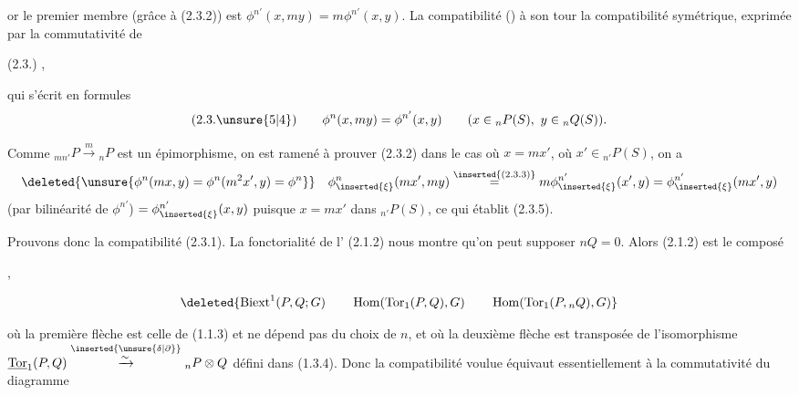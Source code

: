 
or le premier membre (grâce à (2.3.2)) est $\phi^{n'}(x,my)=m\phi^{n'}(x,y)$. La compatibilité  ()  à son tour  la compatibilité symétrique, exprimée par la commutativité de

(2.3.)
,

qui s'écrit en formules
\[
(2.3.\unsure{5|4})\qquad \phi^n(x,my)=\phi^{n'}(x,y)\qquad (x\in{}_nP(S),\ y\in{}_nQ(S)).
\]

Comme ${}_{mn'}P\xrightarrow{m}{}_nP$ est un épimorphisme, on est ramené à prouver (2.3.2) dans le cas où $x=mx'$, où $x'\in{}_{n'}P(S)$,  on a
\[
\deleted{\unsure{\phi^n(mx,y)=\phi^n(m^2x',y)=\phi^n}}
\quad
\phi^n_{\inserted{\xi}}(mx',my)\overset{\inserted{(2.3.3)}}{=}m\phi^{n'}_{\inserted{\xi}}(x',y)=\phi^{n'}_{\inserted{\xi}}(mx',y)
\]
(par bilinéarité de $\phi^{n'}$) $=\phi^{n'}_{\inserted{\xi}}(x,y)$ puisque $x=mx'$ dans ${}_{n'}P(S)$, ce qui établit (2.3.5).

Prouvons donc la compatibilité (2.3.1). La fonctorialité de l' (2.1.2) nous montre qu'on peut supposer $nQ=0$. Alors (2.1.2) est le composé

,

\[
\deleted{\operatorname{Biext}^1(P,Q;G)\qquad\operatorname{Hom}(\operatorname{Tor}_1(P,Q),G)\qquad\operatorname{Hom}(\operatorname{Tor}_1(P,{}_nQ),G)}
\]

où la première flèche est celle de (1.1.3) et ne dépend pas du choix de $n$, et où la deuxième flèche est transposée de l'isomorphisme $\underline{\operatorname{Tor}}_1(P,Q)\overset{\inserted{\unsure{\delta|\partial}}}{\xrightarrow{\sim}}{}_nP\otimes Q$ défini dans (1.3.4). Donc la compatibilité voulue équivaut essentiellement à  la commutativité du diagramme

